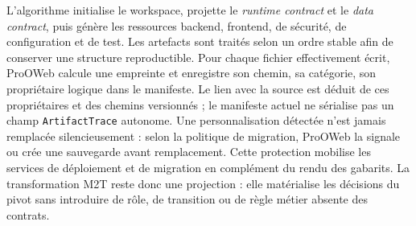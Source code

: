 L'algorithme initialise le workspace, projette le \textit{runtime contract} et le \textit{data contract},
puis génère les ressources backend, frontend, de sécurité, de configuration et
de test. Les artefacts sont traités selon un ordre stable afin de conserver une
structure reproductible. Pour chaque fichier effectivement écrit, ProOWeb
calcule une empreinte et enregistre son chemin, sa catégorie, son propriétaire
logique dans le manifeste. Le lien avec la source est déduit de ces
propriétaires et des chemins versionnés ; le manifeste actuel ne sérialise pas
un champ \texttt{ArtifactTrace} autonome. Une personnalisation détectée n'est
jamais remplacée silencieusement : selon la politique de migration, ProOWeb la
signale ou crée une sauvegarde avant remplacement. Cette protection mobilise
les services de déploiement et de migration en complément du rendu des
gabarits. La transformation M2T reste donc une
projection : elle matérialise les décisions du pivot sans introduire de rôle,
de transition ou de règle métier absente des contrats.



